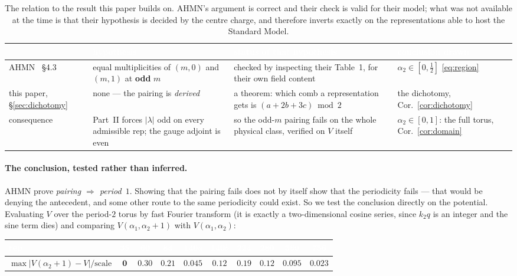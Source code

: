 \documentclass[11pt,a4paper]{article}
\newcommand{\lam}{|\lambda|}
\begin{document}
\begin{table}[t]
\centering\small
\begin{tabular}{p{2.5cm}p{4.6cm}p{4.3cm}p{3.0cm}}
\toprule
\rowcolor{hdrblue}
\textcolor{white}{} & \textcolor{white}{hypothesis} & \textcolor{white}{status of that hypothesis} & \textcolor{white}{conclusion drawn}\\
\midrule
AHMN~\cite{AHMN} \S4.3 &
equal multiplicities of $(m,0)$ and $(m,1)$ at \textbf{odd} $m$ &
checked by inspecting their Table~1, for their own field content &
$\alpha_2\in[0,\tfrac12]$ \eqref{eq:region}\\
\midrule
\rowcolor{softgrey}
this paper, \S\ref{sec:dichotomy} &
none --- the pairing is \emph{derived} &
a theorem: which comb a representation gets is $(a{+}2b{+}3c)\bmod2$ &
the dichotomy, Cor.~\ref{cor:dichotomy}\\
\midrule
consequence &
Part~II forces $\lam$ odd on every admissible rep; the gauge adjoint is even &
so the odd-$m$ pairing fails on the whole physical class, verified on $V$ itself &
$\alpha_2\in[0,1]$: the full torus, Cor.~\ref{cor:domain}\\
\bottomrule
\end{tabular}
\caption{The relation to the result this paper builds on. AHMN's argument is correct and
their check is valid for their model; what was not available at the time is that their
hypothesis is decided by the centre charge, and therefore inverts exactly on the
representations able to host the Standard Model.}
\label{tab:vsahmn}
\end{table}

\paragraph{The conclusion, tested rather than inferred.} AHMN prove \emph{pairing
$\Rightarrow$ period~$1$}. Showing that the pairing fails does not by itself show that the
periodicity fails --- that would be denying the antecedent, and some other route to the same
periodicity could exist. So we test the conclusion directly on the potential. Evaluating $V$
over the period-$2$ torus by fast Fourier transform (it is exactly a two-dimensional cosine
series, since $k_2q$ is an integer and the sine term dies) and comparing
$V(\alpha_1,\alpha_2{+}1)$ with $V(\alpha_1,\alpha_2)$:

\begin{center}\footnotesize
\begin{tabular}{lccccccccc}
\toprule
\rowcolor{hdrblue}
\textcolor{white}{rep} & \textcolor{white}{$\mathbf{35}$} & \textcolor{white}{$\mathbf{60}$} &
\textcolor{white}{$\mathbf{84}$} & \textcolor{white}{$\mathbf{140}a$} & \textcolor{white}{$\mathbf{140}b$} &
\textcolor{white}{$\mathbf{224}$} & \textcolor{white}{$\mathbf{280}$} & \textcolor{white}{$\mathbf{360}$} &
\textcolor{white}{$\mathbf{756}$}\\
\midrule
$\max|V(\alpha_2{+}1)-V|/\text{scale}$ & $\mathbf{0}$ & $0.30$ & $0.21$ & $0.045$ & $0.12$ &
$0.19$ & $0.12$ & $0.095$ & $0.023$\\
\bottomrule
\end{tabular}
\end{center}
\end{document}
